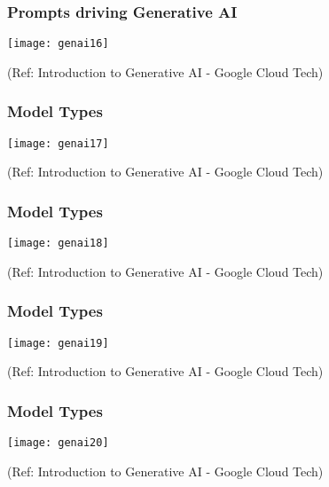\begin{frame}[fragile]\frametitle{Prompts driving Generative AI}

\begin{center}
\texttt{[image: genai16]}
\end{center}


{\tiny (Ref: Introduction to Generative AI - Google Cloud Tech)}

\end{frame}


\begin{frame}[fragile]\frametitle{Model Types}

\begin{center}
\texttt{[image: genai17]}
\end{center}


{\tiny (Ref: Introduction to Generative AI - Google Cloud Tech)}

\end{frame}

\begin{frame}[fragile]\frametitle{Model Types}

\begin{center}
\texttt{[image: genai18]}
\end{center}


{\tiny (Ref: Introduction to Generative AI - Google Cloud Tech)}

\end{frame}

\begin{frame}[fragile]\frametitle{Model Types}

\begin{center}
\texttt{[image: genai19]}
\end{center}


{\tiny (Ref: Introduction to Generative AI - Google Cloud Tech)}

\end{frame}

\begin{frame}[fragile]\frametitle{Model Types}

\begin{center}
\texttt{[image: genai20]}
\end{center}


{\tiny (Ref: Introduction to Generative AI - Google Cloud Tech)}

\end{frame}

